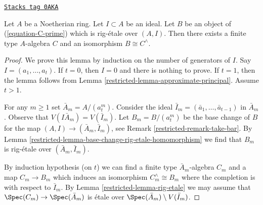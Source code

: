 \begin{lemma}[Approximate]
\label{restricted-lemma-approximate}
\href{https://stacks.math.columbia.edu/tag/0AKA}{\texttt{Stacks tag 0AKA}}

Let $A$ be a Noetherian ring. Let $I \subset A$ be an ideal.
Let $B$ be an object of (\ref{equation-C-prime}) which is
rig-\'etale over $(A, I)$.
Then there exists a finite type $A$-algebra $C$ and an
isomorphism $B \cong C^\wedge$.
\end{lemma}

\begin{proof}

We prove this lemma by induction on the number of generators of $I$.
Say $I = (a_1, \ldots, a_t)$. If $t = 0$, then $I = 0$ and there
is nothing to prove. If $t = 1$, then the lemma follows from
Lemma \ref{restricted-lemma-approximate-principal}. Assume $t > 1$.

\medskip\noindent
For any $m \geq 1$ set $\bar A_m = A/(a_t^m)$. Consider the ideal
$\bar I_m = (\bar a_1, \ldots, \bar a_{t - 1})$ in $\bar A_m$.
Observe that $V(I \bar A_m) = V(\bar I_m)$.
Let $B_m = B/(a_t^m)$ be the base change of $B$ for the
map $(A, I) \to (\bar A_m, \bar I_m)$, see Remark \ref{restricted-remark-take-bar}.
By Lemma \ref{restricted-lemma-base-change-rig-etale-homomorphism}
we find that $B_m$ is rig-\'etale over $(\bar A_m, \bar I_m)$.

\medskip\noindent
By induction hypothesis (on $t$) we can find a finite type
$\bar A_m$-algebra $C_m$ and a map $C_m \to B_m$ which induces an
isomorphism $C_m^\wedge \cong B_m$
where the completion is with respect to $\bar I_m$.
By Lemma \ref{restricted-lemma-rig-etale} we may assume that
$\Spec(C_m) \to \Spec(\bar A_m)$ is \'etale
over $\Spec(\bar A_m) \setminus V(\bar I_m)$.


\end{proof}
